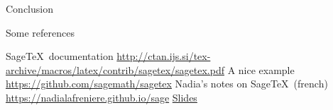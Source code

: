 \documentclass{beamer}
\begin{document}
	\begin{frame}{Conclusion}
	
	{\Large Some references}
	\begin{thebibliography}{99}
		 Sage\TeX ~documentation \url{http://ctan.ijs.si/tex-archive/macros/latex/contrib/sagetex/sagetex.pdf}
		 A nice example\\ \url{https://github.com/sagemath/sagetex}
		 Nadia's notes on Sage\TeX ~(french) \url{https://nadialafreniere.github.io/sage}
		 \href{https://phubert.github.io/sage.html}{Slides}
	\end{thebibliography}
	\end{frame}
\end{document}

